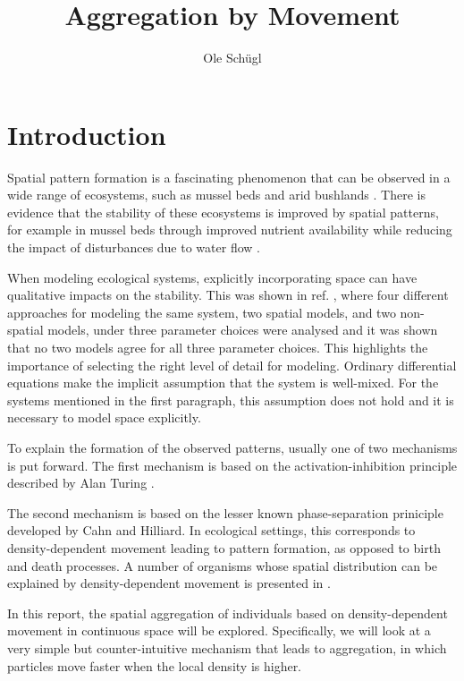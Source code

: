 \documentclass{article}
\title{Aggregation by Movement}
\author{Ole Schügl}
\begin{document}
\maketitle

\section{Introduction}
Spatial pattern formation is a fascinating phenomenon that can be observed in a wide range of ecosystems, such as mussel beds and arid bushlands \autocite{liuPhaseSeparationDriven2016,rietkerkSelfOrganizationVegetationArid}. 
There is evidence that the stability of these ecosystems is improved by spatial patterns, for example in mussel beds through improved nutrient availability while reducing the impact of disturbances due to water flow \autocite{vandekoppelExperimentalEvidenceSpatial2008}.

When modeling ecological systems, explicitly incorporating space can have qualitative impacts on the stability. 
This was shown in ref. \cite{durrettImportanceBeingDiscrete1994}, where four different approaches for modeling the same system, two spatial models, and two non-spatial models, under three parameter choices were analysed and it was shown that no two models agree for all three parameter choices.
This highlights the importance of selecting the right level of detail for modeling. 
Ordinary differential equations make the implicit assumption that the system is well-mixed. 
For the systems mentioned in the first paragraph, this assumption does not hold and it is necessary to model space explicitly.  


To explain the formation of the observed patterns, usually one of two mechanisms is put forward.
The first mechanism is based on the activation-inhibition principle described by Alan Turing \autocite{turingChemicalBasisMorphogenesis1952}.


The second mechanism is based on the lesser known phase-separation priniciple developed by Cahn and Hilliard. 
In ecological settings, this corresponds to density-dependent movement leading to pattern formation, as opposed to birth and death processes. A number of organisms whose spatial distribution can be explained by density-dependent movement is presented in \autocite{liuPhaseSeparationDriven2016}.

In this report, the spatial aggregation of individuals based on density-dependent movement in continuous space will be explored.
Specifically, we will look at a very simple but counter-intuitive mechanism that leads to aggregation, in which particles move faster when the local density is higher.
\end{document}
